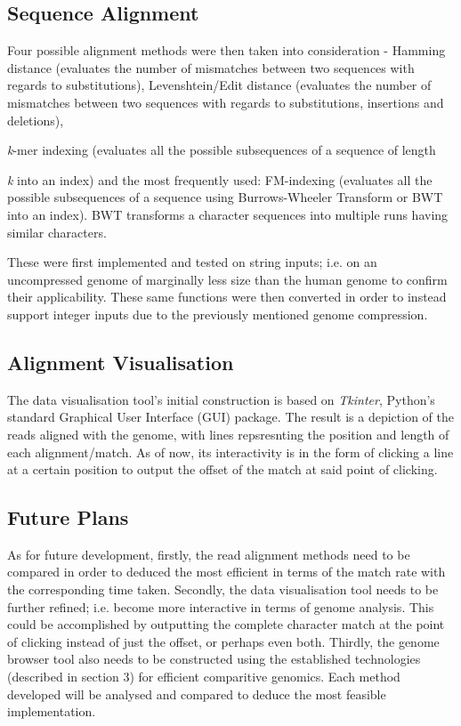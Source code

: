 \documentclass{csfyp}
\begin{document}
\subsection{Sequence Alignment}
Four possible alignment methods were then taken into consideration - Hamming distance (evaluates the number of mismatches between two sequences with regards to substitutions), Levenshtein/Edit distance (evaluates the number of mismatches between two sequences with regards to substitutions, insertions and deletions),  {\textit{k}-mer indexing (evaluates all the possible subsequences of a sequence of length {\textit{k} into an index) and the most frequently used: FM-indexing (evaluates all the possible subsequences of a sequence using Burrows-Wheeler Transform or BWT into an index).  BWT transforms a character sequences into multiple runs having similar characters.  
         
These were first implemented and tested on string inputs; i.e. on an uncompressed genome of marginally less size than the human genome to confirm their applicability.  These same functions were then converted in order to instead support integer inputs due to the previously mentioned genome compression.    

\subsection{Alignment Visualisation}
The data visualisation tool's initial construction is based on {\textit{Tkinter}}, Python's standard Graphical User Interface (GUI) package.  The result is a depiction of the reads aligned with the genome, with lines repsresnting the position and length of each alignment/match.  As of now, its interactivity is in the form of clicking a line at a certain position to output the offset of the match at said point of clicking.     

\subsection{Future Plans}
As for future development, firstly, the read alignment methods need to be compared in order to deduced the most efficient in terms of the match rate with the corresponding time taken.  
Secondly, the data visualisation tool needs to be further refined; i.e. become more interactive in terms of genome analysis.  This could be accomplished by outputting the complete character match at the point of clicking instead of just the offset, or perhaps even both.       
Thirdly, the genome browser tool also needs to be constructed using the established technologies (described in section 3) for efficient comparitive genomics.  Each method developed will be analysed and compared to deduce the most feasible implementation.   


}}
\end{document}
